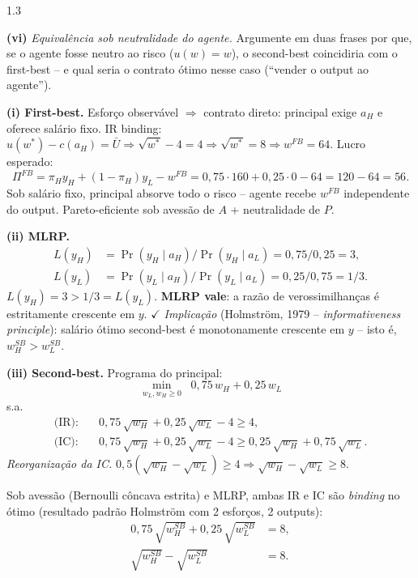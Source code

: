 \documentclass[11pt,addpoints]{exam}
\newcommand{\IC}{\text{(IC)}}
\newcommand{\IR}{\text{(IR)}}
\begin{document}
\begin{spacing}{1.3}
\begin{questions}
\begin{parts}
\textbf{(vi)} \emph{Equivalência sob neutralidade do agente.} Argumente em duas frases por que, se o agente fosse neutro ao risco ($u(w) = w$), o second-best coincidiria com o first-best -- e qual seria o contrato ótimo nesse caso (``vender o output ao agente'').

\begin{solution}
\textbf{(i) First-best.} Esforço observável $\Rightarrow$ contrato direto: principal exige $a_H$ e oferece salário fixo. IR binding: $u(w^*) - c(a_H) = \bar U \Rightarrow \sqrt{w^*} - 4 = 4 \Rightarrow \sqrt{w^*} = 8 \Rightarrow \boxed{w^{FB} = 64.}$ Lucro esperado:
\[
    \Pi^{FB} = \pi_H y_H + (1-\pi_H) y_L - w^{FB} = 0{,}75 \cdot 160 + 0{,}25 \cdot 0 - 64 = 120 - 64 = \boxed{56.}
\]
Sob salário fixo, principal absorve todo o risco -- agente recebe $w^{FB}$ independente do output. Pareto-eficiente sob avessão de $A$ + neutralidade de $P$.

\textbf{(ii) MLRP.}
\begin{align*}
    L(y_H) &= \Pr(y_H \mid a_H)/\Pr(y_H \mid a_L) = 0{,}75 / 0{,}25 = 3, \\
    L(y_L) &= \Pr(y_L \mid a_H)/\Pr(y_L \mid a_L) = 0{,}25 / 0{,}75 = 1/3.
\end{align*}
$L(y_H) = 3 > 1/3 = L(y_L)$. \textbf{MLRP vale}: a razão de verossimilhanças é estritamente crescente em $y$. $\checkmark$ \emph{Implicação} (Holmström, 1979 -- \emph{informativeness principle}): salário ótimo second-best é monotonamente crescente em $y$ -- isto é, $w^{SB}_H > w^{SB}_L$.

\textbf{(iii) Second-best.} Programa do principal:
\[
    \min_{w_L, w_H \geq 0}\;\; 0{,}75\, w_H + 0{,}25\, w_L
\]
s.a.
\begin{align*}
    \IR:&\quad 0{,}75\, \sqrt{w_H} + 0{,}25\, \sqrt{w_L} - 4 \geq 4, \\
    \IC:&\quad 0{,}75\, \sqrt{w_H} + 0{,}25\, \sqrt{w_L} - 4 \geq 0{,}25\, \sqrt{w_H} + 0{,}75\, \sqrt{w_L}.
\end{align*}
\emph{Reorganização da IC.} $0{,}5(\sqrt{w_H} - \sqrt{w_L}) \geq 4 \Rightarrow \sqrt{w_H} - \sqrt{w_L} \geq 8$.

Sob avessão (Bernoulli côncava estrita) e MLRP, ambas IR e IC são \emph{binding} no ótimo (resultado padrão Holmström com 2 esforços, 2 outputs):
\begin{align}
    0{,}75\, \sqrt{w^{SB}_H} + 0{,}25\, \sqrt{w^{SB}_L} &= 8, \tag{IR'} \label{eq:IR-prime} \\
    \sqrt{w^{SB}_H} - \sqrt{w^{SB}_L} &= 8. \tag{IC'} \label{eq:IC-prime}
\end{align}


\end{solution}
\end{parts}
\end{questions}
\end{spacing}
\end{document}
